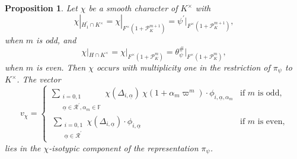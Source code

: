\documentclass[12pt]{amsart}
\newtheorem{proposition}[theorem]{Proposition}
\theoremstyle{definition}
\theoremstyle{remark}
\begin{document}
\begin{proposition}\label{prop4}
Let $\chi$ be a smooth character of $K^\times$ with 
\[\chi|_{H_1^\prime \cap K^\times} =  \chi|_{F^\times (1+\mathcal P_K^{m+1})}  =  \psi^\prime|_{F^\times (1+\mathcal P_K^{m+1})},\]
when $m$ is odd, and 
\[\chi|_{H \cap K^\times} = \chi|_{F^\times (1 +\mathcal P_K^{m})} = \theta_\psi^\#|_{F^\times (1 + \mathcal P_K^{m})},\]
when $m$ is even. Then $\chi$ occurs with multiplicity one in the restriction of $\pi_\psi$ to $K^\times$. The vector 
\[v_\chi =
\begin{cases}
\sum\limits_{\substack{i=0,1 \\  \underline{\alpha} \in \mathcal{R}^\prime, \alpha_m \in \mathbb F }} \chi(\Delta_{i,\underline{\alpha}})~ \chi(1 + \alpha_m \varpi^m) \cdot  \phi_{i,\underline{\alpha}, \alpha_m}  &\text{if $m$ is odd,} \\\
\sum\limits_{\substack{i=0,1 \\  \underline{\alpha} \in \mathcal{R}^\prime  }} \chi(\Delta_{i,\underline{\alpha}}) \cdot  \phi_{i,\underline{\alpha}}    &\text{if $m$ is even,} 
\end{cases}\]
lies in the $\chi$-isotypic component of the representation $\pi_\psi$.
\end{proposition}
\end{document}
